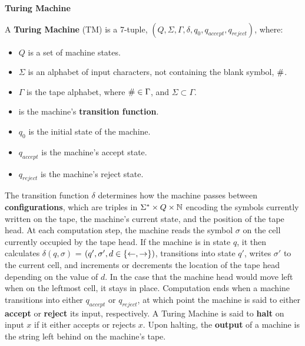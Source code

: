 \begin{definition}{\textbf{Turing Machine}}

  A \textbf{Turing Machine} (TM) is a 7-tuple, $(Q, \Sigma, \Gamma,
  \delta, q_0, q_{accept}, q_{reject})$, where:

  \begin{itemize}
  \item $Q$ is a set of machine states.
  \item $\Sigma$ is an alphabet of input characters, not containing
    the blank symbol, $\#$.
  \item $\Gamma$ is the tape alphabet, where $\# \in \Gamma$, and
    $\Sigma \subset \Gamma$.
  \item {} is the machine's
    \textbf{transition function}.
  \item $q_0$ is the initial state of the machine.
  \item $q_{accept}$ is the machine's accept state.
  \item $q_{reject}$ is the machine's reject state.
  \end{itemize}

  The transition function $\delta$ determines how the machine passes
  between \textbf{configurations}, which are triples in $\Sigma^*
  \times Q \times \mathbb{N}$ encoding the symbols currently written on
  the tape, the machine's current state, and the position of the tape
  head.  At each computation step, the machine reads the symbol
  $\sigma$ on the cell currently occupied by the tape head.  If the
  machine is in state $q$, it then calculates $\delta(q, \sigma)$ =
  $(q', \sigma', d \in \{\leftarrow, \rightarrow\})$, transitions
  into state $q'$, writes $\sigma'$ to the current cell, and
  increments or decrements the location of the tape head depending on
  the value of $d$.  In the case that the machine head would move left
  when on the leftmost cell, it stays in place.  Computation ends when
  a machine transitions into either $q_{accept}$ or $q_{reject}$, at
  which point the machine is said to either \textbf{accept} or
  \textbf{reject} its input, respectively.  A Turing Machine is said
  to \textbf{halt} on input $x$ if it either accepts or rejects $x$.
  Upon halting, the \textbf{output} of a machine is the string left
  behind on the machine's tape.
  
\end{definition}

